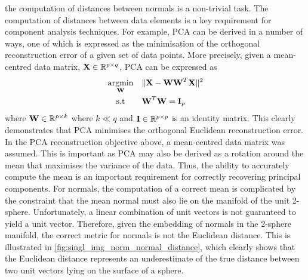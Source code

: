 the computation of distances between normals is a non-trivial task. The
computation of distances between data elements is a key requirement for
component analysis techniques. For example, PCA can be derived in a number of
ways, one of which is expressed as the minimisation of the orthogonal
reconstruction error of a given set of data points. More precisely, given
a mean-centred data matrix, $\boldsymbol{\mathbf{X}} \in \mathbb{R}^{p \times q}$, PCA can be expressed
as
\begin{equation*}
\begin{alignedat}{2}
	&\argmin_{\bb{W}} \quad &&\lVert \bb{X} - \bb{W} \bb{W}^T \bb{X} \rVert^2 \\
	&\quad \, \st      &&\bb{W}^T \bb{W} = \bb{I}_p
\end{alignedat}
\end{equation*}
where $\boldsymbol{\mathbf{W}} \in \mathbb{R}^{p \times k}$ where $k \ll q$ and
$\boldsymbol{\mathbf{I}} \in \mathbb{R}^{p \times p}$ is an identity matrix. This clearly demonstrates
that PCA minimises the orthogonal Euclidean reconstruction error. In the PCA
reconstruction objective above, a mean-centred data matrix was assumed. This is
important as PCA may also be derived as a rotation around the mean that
maximises the variance of the data. Thus, the ability to accurately compute the
mean is an important requirement for correctly recovering principal components.
For normals, the computation of a correct mean
is complicated by the constraint that the mean normal must also lie on the
manifold of the unit 2-sphere. Unfortunately, a linear combination of unit
vectors is not guaranteed to yield a unit vector. 
Therefore, given the embedding of normals
in the 2-sphere manifold, the correct metric for normals is not the Euclidean
distance. This is illustrated in
\cref{fig:singl_img_norm_normal_distance}, which clearly shows that the Euclidean
distance represents an underestimate of the true distance between two unit
vectors lying on the surface of a sphere.
